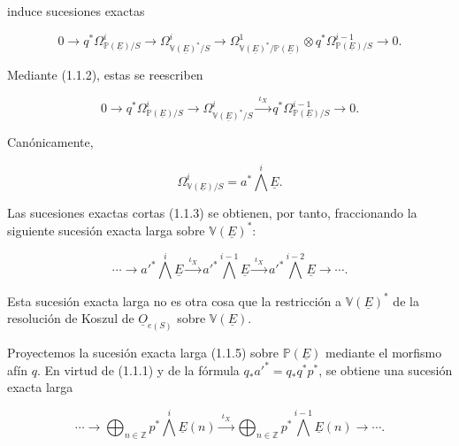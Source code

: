 induce sucesiones exactas

\begin{equation*}
0\longrightarrow q^*\Omega^i_{\mathbb P(\underline E)/S}
\longrightarrow\Omega^i_{\mathbb V(\underline E)^*/S}
\longrightarrow
\Omega^1_{\mathbb V(\underline E)^*/\mathbb P(\underline E)}
\otimes q^*\Omega^{i-1}_{\mathbb P(\underline E)/S}
\longrightarrow0.
\end{equation*}

Mediante (1.1.2), estas se reescriben

\begin{equation}\tag{1.1.3}
0\longrightarrow q^*\Omega^i_{\mathbb P(\underline E)/S}
\longrightarrow\Omega^i_{\mathbb V(\underline E)^*/S}
\xrightarrow{\ \iota_X\ }
q^*\Omega^{i-1}_{\mathbb P(\underline E)/S}
\longrightarrow0.
\end{equation}

Canónicamente,

\begin{equation}\tag{1.1.4}
\Omega^i_{\mathbb V(\underline E)/S}
=a^*\bigwedge^i\underline E.
\end{equation}

Las sucesiones exactas cortas (1.1.3) se obtienen, por tanto, fraccionando
la siguiente sucesión exacta larga sobre $\mathbb V(\underline E)^*$:

\begin{equation}\tag{1.1.5}
\cdots\longrightarrow {a'}^*\bigwedge^i\underline E
\xrightarrow{\ \iota_X\ }
{a'}^*\bigwedge^{i-1}\underline E
\xrightarrow{\ \iota_X\ }
{a'}^*\bigwedge^{i-2}\underline E\longrightarrow\cdots.
\end{equation}

\pageoriginale

Esta sucesión exacta larga no es otra cosa que la restricción a
$\mathbb V(\underline E)^*$ de la resolución de Koszul de
$\underline O_{e(S)}$ sobre $\mathbb V(\underline E)$.

Proyectemos la sucesión exacta larga (1.1.5) sobre
$\mathbb P(\underline E)$ mediante el morfismo afín $q$. En virtud de
(1.1.1) y de la fórmula $q_*{a'}^*=q_*q^*p^*$, se obtiene una sucesión
exacta larga

\begin{equation}\tag{1.1.6}
\cdots\longrightarrow
\bigoplus_{n\in\mathbb Z}p^*\bigwedge^i\underline E(n)
\xrightarrow{\ \iota_X\ }
\bigoplus_{n\in\mathbb Z}p^*\bigwedge^{i-1}\underline E(n)
\longrightarrow\cdots .
\end{equation}

